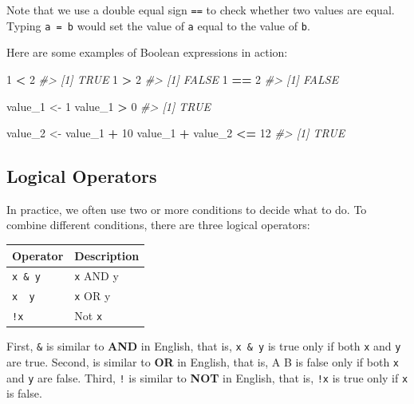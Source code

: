 \documentclass[
]{book}
\newenvironment{Shaded}{\begin{snugshade}}{\end{snugshade}}
\newcommand{\CommentTok}[1]{\textcolor[rgb]{0.56,0.35,0.01}{\textit{#1}}}
\newcommand{\DecValTok}[1]{\textcolor[rgb]{0.00,0.00,0.81}{#1}}
\newcommand{\NormalTok}[1]{#1}
\newcommand{\OperatorTok}[1]{\textcolor[rgb]{0.81,0.36,0.00}{\textbf{#1}}}
\newcommand{\StringTok}[1]{\textcolor[rgb]{0.31,0.60,0.02}{#1}}
\begin{document}
Note that we use a double equal sign \texttt{==} to check whether two values are equal. Typing \texttt{a\ =\ b} would set the value of \texttt{a} equal to the value of \texttt{b}.

Here are some examples of Boolean expressions in action:

\begin{Shaded}
\begin{Highlighting}[]
\DecValTok{1} \OperatorTok{<}\StringTok{ }\DecValTok{2}
\CommentTok{#> [1] TRUE}
\DecValTok{1} \OperatorTok{>}\StringTok{ }\DecValTok{2}
\CommentTok{#> [1] FALSE}
\DecValTok{1} \OperatorTok{==}\StringTok{ }\DecValTok{2}
\CommentTok{#> [1] FALSE}

\NormalTok{value_}\DecValTok{1}\NormalTok{ <-}\StringTok{ }\DecValTok{1}
\NormalTok{value_}\DecValTok{1} \OperatorTok{>}\StringTok{ }\DecValTok{0}
\CommentTok{#> [1] TRUE}

\NormalTok{value_}\DecValTok{2}\NormalTok{ <-}\StringTok{ }\NormalTok{value_}\DecValTok{1} \OperatorTok{+}\StringTok{ }\DecValTok{10}
\NormalTok{value_}\DecValTok{1} \OperatorTok{+}\StringTok{ }\NormalTok{value_}\DecValTok{2} \OperatorTok{<=}\StringTok{ }\DecValTok{12}
\CommentTok{#> [1] TRUE}
\end{Highlighting}
\end{Shaded}

\hypertarget{logical-operators}{%
\subsection{Logical Operators}\label{logical-operators}}

In practice, we often use two or more conditions to decide what to do. To combine different conditions, there are three logical operators:

\begin{longtable}[]{@{}ll@{}}
\toprule
Operator & Description\tabularnewline
\midrule
\endhead
\texttt{x\ \&\ y} & \texttt{x} AND y\tabularnewline
\texttt{x\ \textbar{}\ y} & \texttt{x} OR y\tabularnewline
\texttt{!x} & Not \texttt{x}\tabularnewline
\bottomrule
\end{longtable}

First, \texttt{\&} is similar to \textbf{AND} in English, that is, \texttt{x\ \&\ y} is true only if both \texttt{x} and \texttt{y} are true. Second, is similar to \textbf{OR} in English, that is, A \textbar\textbar{} B is false only if both \texttt{x} and \texttt{y} are false. Third, \texttt{!} is similar to \textbf{NOT} in English, that is, \texttt{!x} is true only if \texttt{x} is false.
\end{document}

